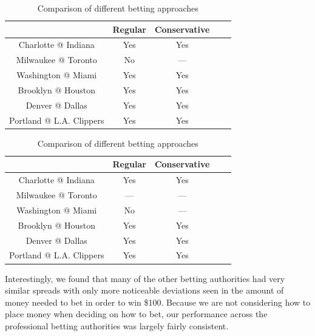 \documentclass{article}
\begin{document}
\begin{table}
  \begin{center}
    \begin{tabular}{ | c | c | c | c | c | }
      \hline
                                & Regular      & Conservative  \\ \hline
      Charlotte @ Indiana       & Yes              & Yes   \\ \hline
      Milwaukee @ Toronto       & No               & ---   \\ \hline
      Washington @ Miami        & Yes              & Yes    \\ \hline
      Brooklyn @ Houston        & Yes              & Yes   \\ \hline
      Denver @ Dallas           & Yes              & Yes   \\ \hline
      Portland @ L.A. Clippers  & Yes              & Yes   \\ \hline
    \end{tabular}
  \end{center}
  \caption{Comparison of different betting approaches}
\end{table}

\begin{table}
  \begin{center}
    \begin{tabular}{ | c | c | c | c | c | }
      \hline
                                & Regular      & Conservative  \\ \hline
      Charlotte @ Indiana       & Yes              & Yes   \\ \hline
      Milwaukee @ Toronto       & ---               & ---   \\ \hline
      Washington @ Miami        & No              & ---    \\ \hline
      Brooklyn @ Houston        & Yes              & Yes   \\ \hline
      Denver @ Dallas           & Yes              & Yes   \\ \hline
      Portland @ L.A. Clippers  & Yes              & Yes   \\ \hline
    \end{tabular}
  \end{center}
  \caption{Comparison of different betting approaches}
\end{table}

Interestingly, we found that many of the other betting authorities had very similar spreads with only more noticeable deviations seen in the amount of money needed to bet in order to win \$100. Because we are not considering how to place money when deciding on how to bet, our performance across the professional betting authorities was largely fairly consistent.
\end{document}

